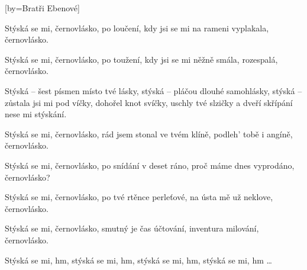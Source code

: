 [by={Bratři Ebenové}]

\beginverse{}
Stýská se mi, černovlásko,
po loučení, kdy jsi se mi
na rameni vyplakala, černovlásko. 
\endverse{}

\beginverse{}
Stýská se mi, černovlásko,
po toužení, kdy jsi se mi
něžně smála, rozespalá, černovlásko.
\endverse{}

\beginchorus{}
Stýská -- šest písmen místo tvé lásky,
stýská -- pláčou dlouhé samohlásky,
stýská -- zůstala jsi mi pod víčky,
dohořel knot svíčky, uschly tvé slzičky
a dveří skřípání nese mi stýskání.
\endchorus{}

\beginverse{}
Stýská se mi, černovlásko,
rád jsem stonal ve tvém klíně,
podleh' tobě i angíně, černovlásko.
\endverse{}

\beginverse{}
Stýská se mi, černovlásko,
po snídání v deset ráno,
proč máme dnes vyprodáno, černovlásko?
\endverse{}

\beginchorus{}
\phantom{}
\endchorus{}

\beginverse{}
Stýská se mi, černovlásko,
po tvé rtěnce perleťové,
na ústa mě už neklove, černovlásko.
\endverse{}

\beginverse{}
Stýská se mi, černovlásko,
smutný je čas účtování,
inventura milování, černovlásko.
\endverse{}

\beginchorus{}
\phantom{}
\endchorus{}

\beginverse*{}
Stýská se mi, hm,  stýská se mi, hm,
stýská se mi, hm,  stýská se mi, hm \ldots{}
\endverse{}

\endsong{}
